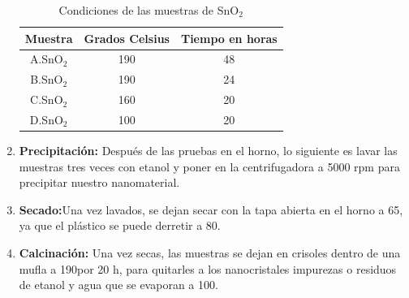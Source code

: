 \documentclass[12pt]{article}
\begin{document}
\begin{enumerate}
        \begin{table}[h]
        \caption{Condiciones de las muestras de SnO$_{2}$}
        \centering
        \begin{tabular}{|c|c|c|}
        \hline
        Muestra & Grados Celsius & Tiempo en horas\\
        \hline
        A.SnO$_{2}$ & 190 & 48\\
        \hline
        B.SnO$_{2}$ & 190 & 24\\
        \hline
        C.SnO$_{2}$ & 160 & 20\\
        \hline
        D.SnO$_{2}$ & 100 & 20\\
        \hline
        \end{tabular}
        \label{tab:tabla_muestras}
        \end{table}

        \item\textbf{Precipitación:} Después de las pruebas en el horno, lo siguiente es lavar las muestras tres veces con etanol y poner en la centrifugadora a 5000 rpm para precipitar nuestro nanomaterial.
        \item\textbf{Secado:}Una vez lavados, se dejan secar con la tapa abierta en el horno a 65, ya que el plástico se puede derretir a 80.
        \item\textbf{Calcinación:} Una vez secas, las muestras se dejan en crisoles dentro de una mufla a 190 por 20 h, para quitarles a los nanocristales impurezas o residuos de etanol y agua que se evaporan a 100.
         \end{enumerate}
\end{document}
